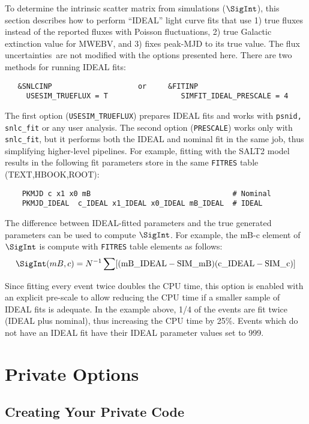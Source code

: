 \documentclass[12pt]{article}
\newcommand{\uncs}{uncertainties}
\begin{document}
To determine the intrinsic scatter matrix from simulations ($\SigInt$),
this section describes how to perform ``IDEAL'' light curve fits that
use 
1) true fluxes instead of the reported fluxes with Poisson 
fluctuations, 
2) true Galactic extinction value for MWEBV, and
3) fixes peak-MJD to its true value.
The flux \uncs\ are not modified with the options presented here.
There are two methods for running IDEAL fits:
%
\begin{verbatim}
   &SNLCINP                    or     &FITINP
     USESIM_TRUEFLUX = T                 SIMFIT_IDEAL_PRESCALE = 4 
\end{verbatim}
%
The first option ({\tt USESIM\_TRUEFLUX}) prepares IDEAL fits
and works with {\tt psnid, snlc\_fit} or any user analysis.
The second option ({\tt PRESCALE}) works only with {\tt snlc\_fit},
but it performs both the IDEAL and nominal fit in the
same job, thus simplifying higher-level pipelines.
For example, fitting with the SALT2 model results
in the following fit parameters store in the same
{\tt FITRES} table (TEXT,HBOOK,ROOT):
\begin{verbatim}
    PKMJD c x1 x0 mB                                 # Nominal
    PKMJD_IDEAL  c_IDEAL x1_IDEAL x0_IDEAL mB_IDEAL  # IDEAL
\end{verbatim}
%

The difference between IDEAL-fitted parameters and the true generated 
parameters can be used to compute $\SigInt$. For example, 
the mB-c element of $\SigInt$ is compute with {\tt FITRES} table
elements as follows:
%
  $$ \SigInt(mB,c) = 
      N^{-1}\sum[{\rm (mB\_IDEAL-SIM\_mB)(c\_IDEAL-SIM\_c)}]
   $$

Since fitting every event twice doubles the CPU time, 
this option is enabled with an explicit pre-scale
to allow reducing the CPU time if a smaller sample
of IDEAL fits is adequate. In the example above,
1/4 of the events are fit twice (IDEAL plus nominal),
thus increasing the CPU time by 25\%. 
Events which do not have an IDEAL fit have their
IDEAL parameter values set to 999.


  \clearpage
  \section{Private Options}
  \label{sec:private}



   \subsection{Creating Your Private Code }
   \label{subsec:private_fitter}
\end{document}
